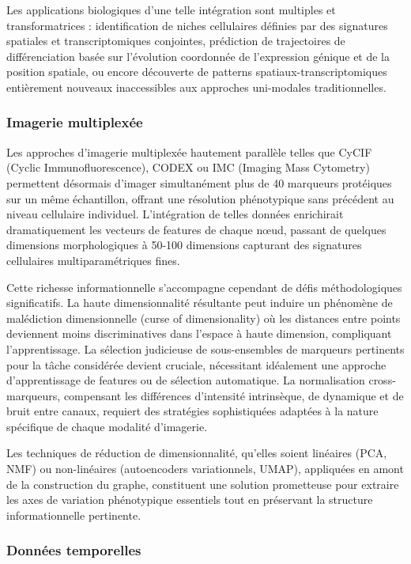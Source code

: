 Les applications biologiques d'une telle intégration sont multiples et transformatrices : identification de niches cellulaires définies par des signatures spatiales et transcriptomiques conjointes, prédiction de trajectoires de différenciation basée sur l'évolution coordonnée de l'expression génique et de la position spatiale, ou encore découverte de patterns spatiaux-transcriptomiques entièrement nouveaux inaccessibles aux approches uni-modales traditionnelles.

\subsubsection{Imagerie multiplexée}

Les approches d'imagerie multiplexée hautement parallèle telles que CyCIF (Cyclic Immunofluorescence), CODEX ou IMC (Imaging Mass Cytometry) permettent désormais d'imager simultanément plus de 40 marqueurs protéiques sur un même échantillon, offrant une résolution phénotypique sans précédent au niveau cellulaire individuel. L'intégration de telles données enrichirait dramatiquement les vecteurs de features de chaque nœud, passant de quelques dimensions morphologiques à 50-100 dimensions capturant des signatures cellulaires multiparamétriques fines.

Cette richesse informationnelle s'accompagne cependant de défis méthodologiques significatifs. La haute dimensionnalité résultante peut induire un phénomène de malédiction dimensionnelle (curse of dimensionality) où les distances entre points deviennent moins discriminatives dans l'espace à haute dimension, compliquant l'apprentissage. La sélection judicieuse de sous-ensembles de marqueurs pertinents pour la tâche considérée devient cruciale, nécessitant idéalement une approche d'apprentissage de features ou de sélection automatique. La normalisation cross-marqueurs, compensant les différences d'intensité intrinsèque, de dynamique et de bruit entre canaux, requiert des stratégies sophistiquées adaptées à la nature spécifique de chaque modalité d'imagerie.

Les techniques de réduction de dimensionnalité, qu'elles soient linéaires (PCA, NMF) ou non-linéaires (autoencoders variationnels, UMAP), appliquées en amont de la construction du graphe, constituent une solution prometteuse pour extraire les axes de variation phénotypique essentiels tout en préservant la structure informationnelle pertinente.

\subsubsection{Données temporelles}


